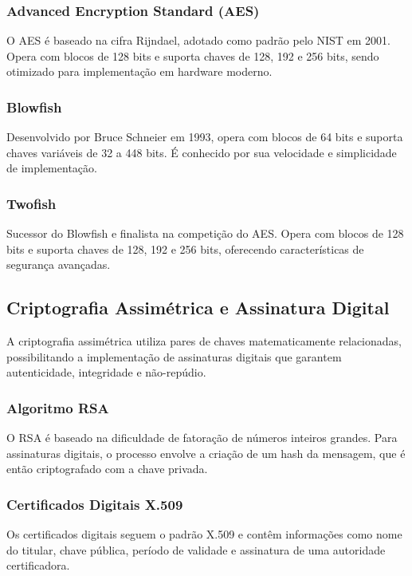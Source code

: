 \documentclass[12pt,a4paper,oneside]{article}
\begin{document}
\subsubsection{Advanced Encryption Standard (AES)}

O AES é baseado na cifra Rijndael, adotado como padrão pelo NIST em 2001. Opera com blocos de 128 bits e suporta chaves de 128, 192 e 256 bits, sendo otimizado para implementação em hardware moderno.

\subsubsection{Blowfish}

Desenvolvido por Bruce Schneier em 1993, opera com blocos de 64 bits e suporta chaves variáveis de 32 a 448 bits. É conhecido por sua velocidade e simplicidade de implementação.

\subsubsection{Twofish}

Sucessor do Blowfish e finalista na competição do AES. Opera com blocos de 128 bits e suporta chaves de 128, 192 e 256 bits, oferecendo características de segurança avançadas.

\subsection{Criptografia Assimétrica e Assinatura Digital}

A criptografia assimétrica utiliza pares de chaves matematicamente relacionadas, possibilitando a implementação de assinaturas digitais que garantem autenticidade, integridade e não-repúdio.

\subsubsection{Algoritmo RSA}

O RSA é baseado na dificuldade de fatoração de números inteiros grandes. Para assinaturas digitais, o processo envolve a criação de um hash da mensagem, que é então criptografado com a chave privada.

\subsubsection{Certificados Digitais X.509}

Os certificados digitais seguem o padrão X.509 e contêm informações como nome do titular, chave pública, período de validade e assinatura de uma autoridade certificadora.
\end{document}
